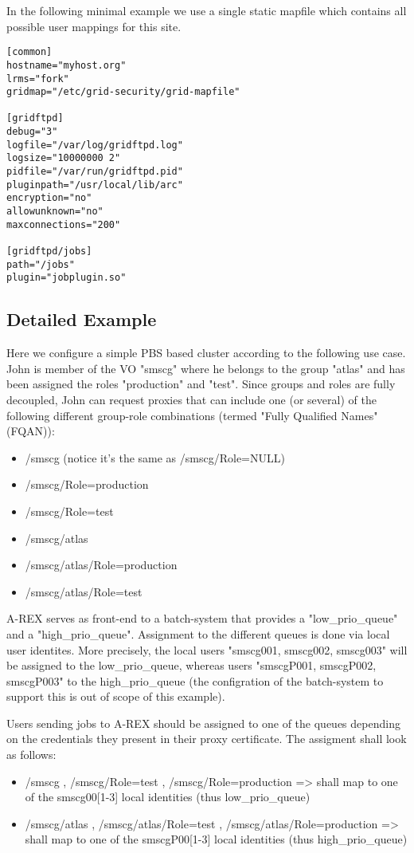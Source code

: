 \documentclass{article}
\begin{document}
In the following minimal example we use a single static mapfile which
contains all possible user mappings for this site.

\begin{verbatim}
[common]
hostname="myhost.org"
lrms="fork"
gridmap="/etc/grid-security/grid-mapfile"

[gridftpd]
debug="3"
logfile="/var/log/gridftpd.log"
logsize="10000000 2"
pidfile="/var/run/gridftpd.pid"
pluginpath="/usr/local/lib/arc"
encryption="no"
allowunknown="no"
maxconnections="200"

[gridftpd/jobs]
path="/jobs"
plugin="jobplugin.so"
\end{verbatim}


\subsection{Detailed Example}

Here we configure a simple PBS based cluster according to the
following use case.  John is member of the VO "smscg" where he belongs
to the group "atlas" and has been assigned the roles "production" and
"test". Since groups and roles are fully decoupled, John can request
proxies that can include one (or several) of the following different
group-role combinations (termed "Fully Qualified Names" (FQAN)):
\begin{itemize}
\item /smscg (notice it's the same as /smscg/Role=NULL)
\item /smscg/Role=production
\item /smscg/Role=test
\item /smscg/atlas
\item /smscg/atlas/Role=production
\item /smscg/atlas/Role=test
\end{itemize}

A-REX serves as front-end to a batch-system that provides a
"low\_prio\_queue" and a "high\_prio\_queue". Assignment to the
different queues is done via local user identites.  More precisely,
the local users "smscg001, smscg002, smscg003" will be assigned to the
low\_prio\_queue, whereas users "smscgP001, smscgP002, smscgP003" to
the high\_prio\_queue (the configration of the batch-system to support
this is out of scope of this example).

Users sending jobs to A-REX should be assigned to one of the queues
depending on the credentials they present in their proxy
certificate. The assigment shall look as follows:
\begin{itemize}
\item /smscg , /smscg/Role=test , /smscg/Role=production => shall map
  to one of the smscg00[1-3] local identities (thus low\_prio\_queue)
\item /smscg/atlas , /smscg/atlas/Role=test ,
  /smscg/atlas/Role=production => shall map to one of the
  smscgP00[1-3] local identities (thus high\_prio\_queue)
\end{itemize}
\end{document}
